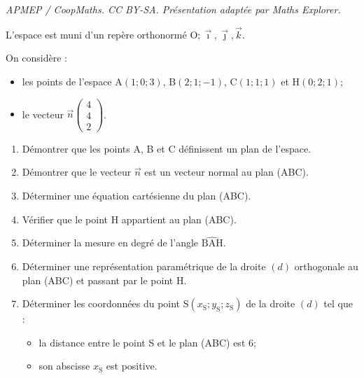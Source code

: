 \documentclass[10pt]{article}
\providecommand{\vect}[1]{\overrightarrow{#1}}
\providecommand{\Oijk}{\(\mathrm{O};\vec{\imath},\vec{\jmath},\vec{k}\)}
\begin{document}
\noindent\textit{APMEP / CoopMaths. CC BY-SA. Présentation adaptée par Maths Explorer.}\par\medskip
L'espace est muni d'un repère orthonormé \Oijk{}.

On considère :

\begin{itemize}[label=\textbullet~]
	\item les points de l'espace A$(1 ; 0 ; 3)$, B$(2 ; 1 ;-1)$, C$(1 ; 1 ; 1)$ et H$(0 ; 2 ; 1)$;
	\item le vecteur $\vect{n}\begin{pmatrix}4 \\ 4 \\ 2\end{pmatrix}$.
\end{itemize}

\begin{enumerate}
	\item Démontrer que les points A, B et C définissent un plan de l'espace.

	\item Démontrer que le vecteur $\vect{n}$ est un vecteur normal au plan (ABC).

	\item Déterminer une équation cartésienne du plan (ABC).

	\item Vérifier que le point H appartient au plan (ABC).

	\item Déterminer la mesure en degré de l'angle $\widehat{\mathrm{BAH}}$.

	\item Déterminer une représentation paramétrique de la droite $(d)$ orthogonale au plan (ABC) et passant par le point H.

	\item Déterminer les coordonnées du point S$\left(x_{\mathrm{S}} ; y_{\mathrm{S}} ; z_{\mathrm{S}}\right)$ de la droite $(d)$ tel que :
	\begin{itemize}[label=\textbullet~,left=1cm]
		\item la distance entre le point S et le plan (ABC) est 6;
		\item son abscisse $x_{\mathrm{S}}$ est positive.
	\end{itemize}
\end{enumerate}
\end{document}
